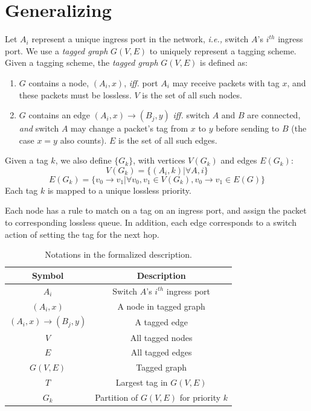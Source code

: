 \section{Generalizing \sysname{}}
\label{sec:generic}


Let $A_i$ represent a unique ingress port in the network, {\em i.e.,} switch
$A$'s $i^{th}$ ingress port.  We use a {\em tagged graph} $G(V,E)$ to uniquely
represent a tagging scheme.  Given a tagging scheme, the {\em tagged graph}
$G(V,E)$ is defined as:

\begin{enumerate}
\item $G$ contains a node, $(A_i, x)$, {\em iff.} port $A_i$ may receive packets with tag $x$, and these packets must
be lossless. $V$ is the set of all such nodes.

\item $G$ contains an edge $(A_i, x)\rightarrow(B_j, y)$ {\em iff.} switch $A$ and $B$ are
connected, {\em and} switch $A$ may change a packet's tag from $x$ to $y$ before sending to $B$ (the case $x=y$ also counts).
$E$ is the set of all such edges.

\end{enumerate}

Given a tag $k$, we also define $\{G_k\}$, with vertices $V(G_k)$ and edges
$E(G_k)$:
$$V(G_k) = \{(A_i, k) | \forall A, i\} $$
$$E(G_k) = \{v_0 \rightarrow v_1 | \forall v_0, v_1 \in V(G_k),  v_0 \rightarrow v_1 \in E(G)\} $$
Each tag $k$ is mapped to a unique lossless priority.

Each node has a rule to match on a tag on an ingress port, and assign the packet
to corresponding lossless queue.  In addition, each edge corresponds to a switch
action of setting the tag for the next hop.

\begin{table}[t]
\footnotesize
\centering
\begin{tabular}{|c|c|}
\hline
Symbol & Description \\ \hline
$A_i$ & Switch $A$'s $i^{th}$ ingress port  \\ \hline
$(A_i, x)$ & A node in tagged graph \\ \hline
$(A_i, x)\rightarrow(B_j, y)$ & A tagged edge \\ \hline
$V$ & All tagged nodes  \\ \hline
$E$ & All tagged edges \\ \hline
$G(V, E)$ & Tagged graph \\ \hline
$T$ & Largest tag in $G(V,E)$ \\ \hline
$G_k$ & Partition of $G(V,E)$ for priority $k$ \\ \hline
\end{tabular}
\caption{Notations in the formalized description.}
\label{tab:symbols}
\end{table}



